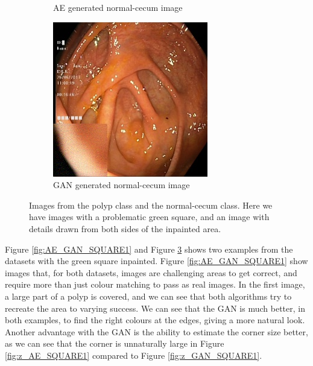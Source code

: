 \begin{figure}
\begin{subfigure}[t]{\myfigsizethree}
            \caption{AE generated normal-cecum image}   
            \label{fig:nc_AE_SQUARE2}
        \end{subfigure}
        \qquad%
        \begin{subfigure}[t]{\myfigsizethree}   
            \centering 
            \includegraphics[width=\textwidth]{experiments/figures/greensquare/ncGAN.jpg}
            \caption{GAN generated normal-cecum image}  
            \label{fig:nc_GAN_SQUARE2}
        \end{subfigure}
        \caption{Images from the polyp class and the normal-cecum class. Here we have images with a problematic green square, and an image with details drawn from both sides of the inpainted area.} 
        \label{fig:AE_GAN_SQUARE2}
\end{figure}
    
Figure \ref{fig:AE_GAN_SQUARE1} and Figure \ref{fig:AE_GAN_SQUARE2} shows two examples from the datasets with the green square inpainted.
Figure \ref{fig:AE_GAN_SQUARE1} show images that, for both datasets, images are challenging areas to get correct, and require more than just colour matching to pass as real images. In the first image, a large part of a polyp is covered, and we can see that both algorithms try to recreate the area to varying success. We can see that the GAN is much better, in both examples, to find the right colours at the edges, giving a more natural look.
Another advantage with the GAN is the ability to estimate the corner size better, as we can see that the corner is unnaturally large in Figure \ref{fig:z_AE_SQUARE1} compared to Figure \ref{fig:z_GAN_SQUARE1}.
 
